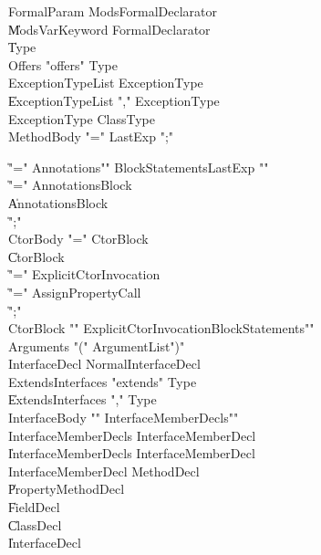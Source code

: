 \begin{grammar}
 FormalParam  \:   Mods\opt  FormalDeclarator\\
    \|   Mods\opt  VarKeyword  FormalDeclarator\\
    \|   Type\\
 Offers  \:   \xcd"offers"  Type\\
 ExceptionTypeList  \:   ExceptionType\\
    \|   ExceptionTypeList  \xcd","  ExceptionType\\
 ExceptionType  \:   ClassType\\
 MethodBody  \:   \xcd"="  LastExp  \xcd";"\\
\end{grammar}

\begin{grammar}

    \|   \xcd"="  Annotations\opt  \xcd"{"  BlockStatements\opt  LastExp  \xcd"}"\\
    \|   \xcd"="  Annotations\opt  Block\\
    \|   Annotations\opt  Block\\
    \|   \xcd";"\\
 CtorBody  \:   \xcd"="  CtorBlock\\
    \|   CtorBlock\\
    \|   \xcd"="  ExplicitCtorInvocation\\
    \|   \xcd"="  AssignPropertyCall\\
    \|   \xcd";"\\
 CtorBlock  \:   \xcd"{"  ExplicitCtorInvocation\opt  BlockStatements\opt  \xcd"}"\\
 Arguments  \:   \xcd"("  ArgumentList\opt  \xcd")"\\
 InterfaceDecl  \:   NormalInterfaceDecl\\
 ExtendsInterfaces  \:   \xcd"extends"  Type\\
    \|   ExtendsInterfaces  \xcd","  Type\\
 InterfaceBody  \:   \xcd"{"  InterfaceMemberDecls\opt  \xcd"}"\\
 InterfaceMemberDecls  \:   InterfaceMemberDecl\\
    \|   InterfaceMemberDecls  InterfaceMemberDecl\\
 InterfaceMemberDecl  \:   MethodDecl\\
    \|   PropertyMethodDecl\\
    \|   FieldDecl\\
    \|   ClassDecl\\
    \|   InterfaceDecl\\

\end{grammar}
